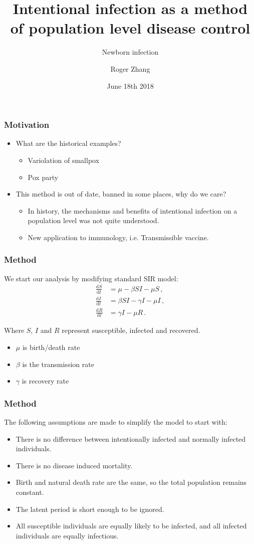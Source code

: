 \documentclass[12pt]{beamer}
\title{Intentional infection as a method of population level disease control}
\subtitle{Newborn infection}
\author{Roger Zhang}
\date{June 18th 2018}
\institute{McMaster University}
\newcommand\dbyd[2]{\frac{\mathrm d{#1}}{\mathrm d{#2}}}
\begin{document}
\begin{frame}
\titlepage
\end{frame}
\begin{frame}
\frametitle{Motivation}
\begin{itemize}
\setlength\itemsep{10pt}
\item What are the historical examples?
\pause
\begin{itemize}
\setlength\itemsep{10pt}
\item Variolation of smallpox
\item Pox party
\end{itemize}
\pause
\item This method is out of date, banned in some places, why do we care?
\pause
\begin{itemize}
\setlength\itemsep{10pt}
\item In history, the mechanisms and benefits of intentional infection  on a population level was not quite understood.
\item New application to immunology, i.e. Transmissible vaccine.
\end{itemize}
\end{itemize}
\end{frame}
\begin{frame}
\frametitle{Method}
We start our analysis by modifying standard SIR model:
\pause
\begin{equation}\label{1}
\begin{split}
\dbyd{S}{t}&=\mu- \beta SI-\mu S \,,\\
\dbyd{I}{t}&=\beta SI-\gamma I -\mu I\,,\\
\dbyd{R}{t}&=\gamma I-\mu R\,.
\end{split}
\end{equation}

Where $S$, $I$ and $R$ represent susceptible, infected and recovered.
\begin{itemize}
\setlength\itemsep{10pt}
\item $\mu$ is birth/death rate
\item $\beta$ is the transmission rate
\item $\gamma$ is recovery rate
\end{itemize}
\end{frame}
\begin{frame}
\frametitle{Method}
The following assumptions are made to simplify the model to start with:
\begin{itemize}\itemsep10pt
\item There is no difference between intentionally infected and normally infected individuals.
\item There is no disease induced mortality.
\item Birth and natural death rate are the same, so the total population remains constant.
\item The latent period is short enough to be ignored.
\item All susceptible individuals are equally likely to be infected, and all infected individuals are equally infectious.
\end{itemize}
\end{frame}
\end{document}
